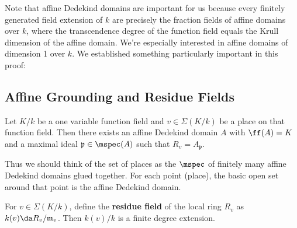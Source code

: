 \begin{remark}

Note that affine Dedekind domains are important for us because every
finitely generated field extension of \(k\) are precisely the fraction
fields of affine domains over \(k\), where the transcendence degree of
the function field equals the Krull dimension of the affine domain.
We're especially interested in affine domains of dimension 1 over \(k\).
We established something particularly important in this proof:

\end{remark}

\hypertarget{affine-grounding-and-residue-fields}{%
\subsection{Affine Grounding and Residue
Fields}\label{affine-grounding-and-residue-fields}}

\begin{lemma}

Let \(K/k\) be a one variable function field and \(v\in \Sigma(K/k)\) be
a place on that function field. Then there exists an affine Dedekind
domain \(A\) with \(\ff(A) = K\) and a maximal ideal
\(\mathfrak{p}\in \mspec(A)\) such that \(R_v = A_{\mathfrak{p}}\).

\end{lemma}

Thus we should think of the set of places as the \(\mspec\) of finitely
many affine Dedekind domains glued together. For each point (place), the
basic open set around that point is the affine Dedekind domain.

\begin{corollary}[?]

For \(v \in \Sigma(K/k)\), define the \textbf{residue field} of the
local ring \(R_v\) as \(k(v) \da R_v / \mathfrak{m}_v\). Then
\(k(v)/ k\) is a finite degree extension.

\end{corollary}

